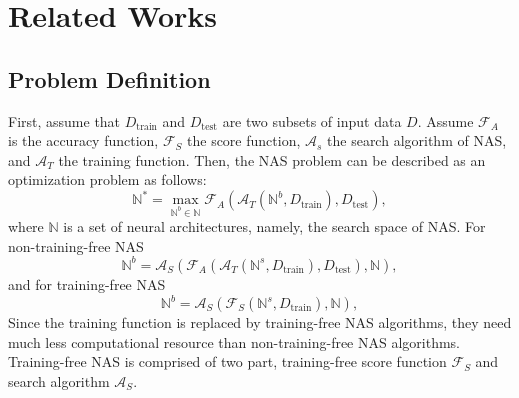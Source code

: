 \documentclass[sigconf]{acmart}
\begin{document}
    \section{Related Works}
    \label{sec:related_work}

    \subsection{Problem Definition}
    First, assume that $D_{\text{train}}$ and $D_{\text{test}}$ are two subsets of input data $D$. 
    Assume $\mathcal F_A$ is the accuracy function, $\mathcal F_S$ the score function, $\mathcal A_s$ the 
    search algorithm of NAS, and $\mathcal A_T$ the training function. Then, the NAS problem can be 
    described as an optimization problem as follows: 
    \begin{equation}
        \label{equ:nas}
        \mathbb N^*=\max_{\mathbb N^b\in\mathbb N}\mathcal F_A(\mathcal A_T(\mathbb N^b, D_{\text{train}}), D_{\text{test}}),
    \end{equation}
    where $\mathbb N$ is a set of neural architectures, namely, the search space of NAS. 
    For non-training-free NAS 
    \begin{equation}
        \label{equ:non-training_free_nas}
        \mathbb N^b=\mathcal A_S(\mathcal F_A(\mathcal A_T(\mathbb N^s, D_{\text{train}}), D_{\text{test}}), \mathbb N),
    \end{equation}
    and for training-free NAS 
    \begin{equation}
        \label{equ:training_free_nas}
        \mathbb N^b=\mathcal A_S(\mathcal F_S(\mathbb N^s, D_{\text{train}}), \mathbb N),
    \end{equation}
    Since the training function is replaced by training-free NAS algorithms, they need much less 
    computational resource than non-training-free NAS algorithms. 
    Training-free NAS is comprised of two part, training-free score function $\mathcal F_S$ and 
    search algorithm $\mathcal A_S$. 
\end{document}
